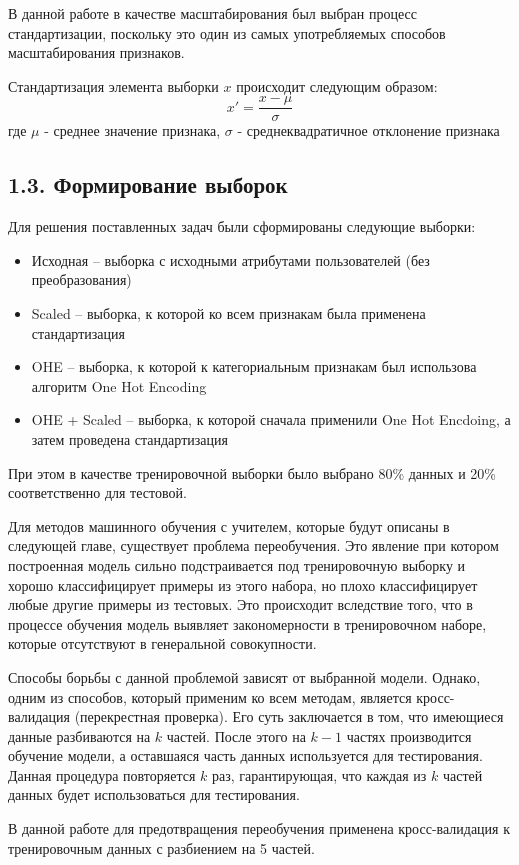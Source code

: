 В данной работе в качестве масштабирования был выбран процесс стандартизации, поскольку это один из самых употребляемых способов масштабирования признаков.

Стандартизация элемента выборки $x$ происходит следующим образом:
$$x' = \frac{x - \mu}{\sigma} $$
где $\mu$ - среднее значение признака, $\sigma$ - среднеквадратичное отклонение признака

\subsection{1.3. Формирование выборок}

Для решения поставленных задач были сформированы следующие выборки:
\begin{itemize}
\item Исходная -- выборка с исходными атрибутами пользователей (без преобразования)
\item Scaled -- выборка, к которой ко всем признакам была применена стандартизация
\item OHE -- выборка, к которой к категориальным признакам был использова алгоритм One Hot Encoding 
\item OHE + Scaled -- выборка, к которой сначала применили One Hot Encdoing, а затем проведена стандартизация
\end{itemize}

При этом в качестве тренировочной выборки было выбрано 80\% данных и 20\% соответственно для тестовой.   

Для методов машинного обучения с учителем, которые будут описаны в следующей главе, существует проблема переобучения. Это явление при котором построенная модель сильно подстраивается под тренировочную выборку и хорошо классифицирует примеры из этого набора, но плохо классифицирует любые другие примеры из тестовых. Это происходит вследствие того, что в процессе обучения модель выявляет закономерности в тренировочном наборе, которые отсутствуют в генеральной совокупности. 

Способы борьбы с данной проблемой зависят от выбранной модели. Однако, одним из способов, который применим ко всем методам, является кросс-валидация (перекрестная проверка). Его суть заключается в том, что имеющиеся данные разбиваются на $k$ частей. После этого на $k-1$ частях производится обучение модели, а оставшаяся часть данных используется для тестирования. Данная процедура повторяется $k$ раз, гарантирующая, что каждая из $k$ частей данных будет использоваться для тестирования.

В данной работе для предотвращения переобучения применена кросс-валидация к тренировочным данных с разбиением на 5 частей. 


\clearpage